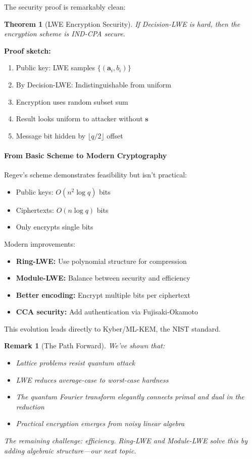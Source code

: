 \documentclass[11pt,a4paper]{article}
\newtheorem{theorem}{Theorem}
\newtheorem{remark}{Remark}
\begin{document}
The security proof is remarkably clean:

\begin{theorem}[LWE Encryption Security]
If Decision-LWE is hard, then the encryption scheme is IND-CPA secure.
\end{theorem}

\textbf{Proof sketch:}
\begin{enumerate}
    \item Public key: LWE samples $\{(\mathbf{a}_i, b_i)\}$
    \item By Decision-LWE: Indistinguishable from uniform
    \item Encryption uses random subset sum
    \item Result looks uniform to attacker without $\mathbf{s}$
    \item Message bit hidden by $\lfloor q/2 \rfloor$ offset
\end{enumerate}

\paragraph{From Basic Scheme to Modern Cryptography}

Regev's scheme demonstrates feasibility but isn't practical:
\begin{itemize}
    \item Public keys: $O(n^2 \log q)$ bits
    \item Ciphertexts: $O(n \log q)$ bits  
    \item Only encrypts single bits
\end{itemize}

Modern improvements:
\begin{itemize}
    \item \textbf{Ring-LWE:} Use polynomial structure for compression
    \item \textbf{Module-LWE:} Balance between security and efficiency
    \item \textbf{Better encoding:} Encrypt multiple bits per ciphertext
    \item \textbf{CCA security:} Add authentication via Fujisaki-Okamoto
\end{itemize}

This evolution leads directly to Kyber/ML-KEM, the NIST standard.

\begin{remark}[The Path Forward]
We've shown that:
\begin{itemize}
    \item Lattice problems resist quantum attack
    \item LWE reduces average-case to worst-case hardness
    \item The quantum Fourier transform elegantly connects primal and dual in the reduction
    \item Practical encryption emerges from noisy linear algebra
\end{itemize}
The remaining challenge: efficiency. Ring-LWE and Module-LWE solve this by adding algebraic structure—our next topic.
\end{remark}
\end{document}
